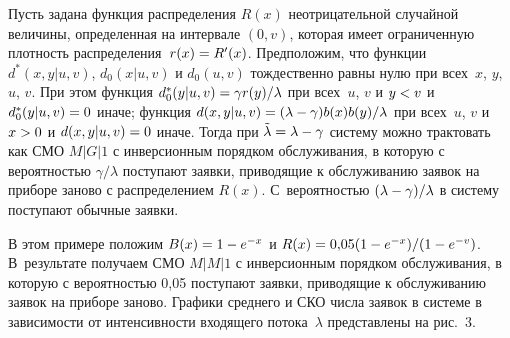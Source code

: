 \begin{multicols}{2}
 Пусть задана функция распределения $R(x)$
не\-от\-ри\-ца\-тельной случайной величины,
определенная на интервале $(0,v)$, которая имеет ограниченную плотность
распределения~$r(x)\hm=R'(x)$.  Предположим, что функции $d^*(x,y|u,v)$,
$d_0(x|u,v)$ и $d_0(u,v)$ тождественно равны нулю
при всех~$x$, $y$, $u$, $v$.
 При этом функция $d_0^*(y|u,v)\hm=\gamma r(y)/\lambda$
при всех~$u$, $v$ и $y\hm<v$ и $d_0^*(y|u,v)\hm=0$
иначе; функция $d(x,y|u,v)\hm=(\lambda - \gamma) b(x)b(y)/\lambda$
при всех~$u$, $v$ и $x\hm>0$ и $d(x,y|u,v)\hm=0$ иначе.
 Тогда при $\tl\hm=\lambda \hm- \gamma$ систему
можно трактовать как СМО $M|G|1$ с инверсионным порядком обслуживания, в которую
с вероятностью $\gamma/\lambda$ поступают заявки,
приводящие к обслуживанию заявок на приборе
заново с распределением $R(x)$.  С~вероятностью $(\lambda \hm- \gamma)/\lambda$
в систему поступают обычные заявки.

В этом примере положим $B(x)\hm=1\hm-e^{-x}$
и $R(x)\hm=0{,}05 (1\hm- e^{- x})/(1\hm-e^{- v})$.
В~результате получаем СМО $M|M|1$ с инверсионным порядком обслуживания,
в которую с вероятностью 0,05 поступают заявки,
приводящие к обслуживанию заявок на приборе заново.
Графики среднего и СКО числа заявок в системе в зависимости
от интенсивности входящего потока~$\lambda$ представлены на рис.~3.

\begin{figure*} %
\begin{minipage}[t]{80mm}
\vspace*{1pt}
\begin{center}
\mbox{%
\epsfxsize=73.119mm
}
\end{center}
\vspace*{-9pt}
\end{minipage}
\hfill
\begin{minipage}[t]{81.5mm}
\vspace*{1pt}
\begin{center}
\mbox{%
\epsfxsize=73.126mm
}
\end{center}
\vspace*{-9pt}
\label{ris:image2}
\end{minipage}
\end{figure*}





\end{multicols}
